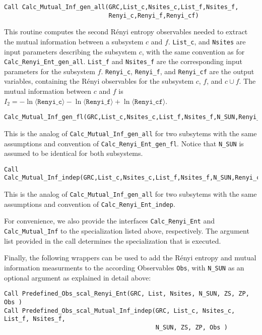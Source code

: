 \begin{lstlisting}[style=fortran]
Call Calc_Mutual_Inf_gen_all(GRC,List_c,Nsites_c,List_f,Nsites_f,
                             Renyi_c,Renyi_f,Renyi_cf)
\end{lstlisting}
This routine computes the second R\'enyi entropy observables needed to extract the mutual information between a subsystem $c$ and $f$. \texttt{List\_c}, and \texttt{Nsites} are input parameters describing the subsystem $c$, with the same convention as for \texttt{Calc\_Renyi\_Ent\_gen\_all}. \texttt{List\_f} and \texttt{Nsites\_f} are the corresponding input parameters for the subsystem $f$. \texttt{Renyi\_c}, \texttt{Renyi\_f}, and \texttt{Renyi\_cf} are the output variables, containing the R\'enyi observables for the subsystem $c$, $f$, and $c\cup f$. The mutual information between $c$ and $f$ is $I_2=-\ln \langle \texttt{Renyi\_c}\rangle -\ln \langle \texttt{Renyi\_f}\rangle +\ln \langle \texttt{Renyi\_cf}\rangle$.

\begin{lstlisting}[style=fortran,breaklines=true]
Calc_Mutual_Inf_gen_fl(GRC,List_c,Nsites_c,List_f,Nsites_f,N_SUN,Renyi_c,Renyi_f,Renyi_cf)
\end{lstlisting}
This is the analog of \texttt{Calc\_Mutual\_Inf\_gen\_all} for two subsytems with the same assumptions and convention of \texttt{Calc\_Renyi\_Ent\_gen\_fl}. Notice that \texttt{N\_SUN} is assumed to be identical for both subsystems.

\begin{lstlisting}[style=fortran,breaklines=true]
Call Calc_Mutual_Inf_indep(GRC,List_c,Nsites_c,List_f,Nsites_f,N_SUN,Renyi_c,Renyi_f,Renyi_cf)
\end{lstlisting}
This is the analog of \texttt{Calc\_Mutual\_Inf\_gen\_all} for two subsytems with the same assumptions and convention of \texttt{Calc\_Renyi\_Ent\_indep}.

For convenience, we also provide the interfaces \texttt{Calc\_Renyi\_Ent} and \texttt{Calc\_Mutual\_Inf} to the specialization listed above, respectively. The argument list provided in the call determines the specialization that is executed.

Finally, the following wrappers can be used to add the R{\'e}nyi entropy and mutual information measurments to the according Observables \texttt{Obs}, with \texttt{N\_SUN} as an optional argument as explained in detail above:
\begin{lstlisting}[style=fortran,breaklines=true]
Call Predefined_Obs_scal_Renyi_Ent(GRC, List, Nsites, N_SUN, ZS, ZP, Obs )
Call Predefined_Obs_scal_Mutual_Inf_indep(GRC, List_c, Nsites_c, List_f, Nsites_f,
                                          N_SUN, ZS, ZP, Obs )
\end{lstlisting}
